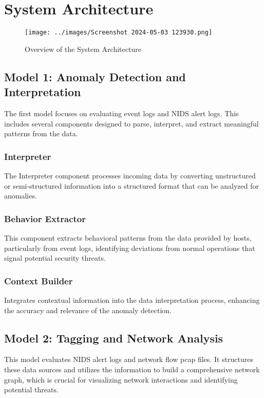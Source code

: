 \section{System Architecture}

\begin{figure*}[!htb]
    \centering
    \texttt{[image: ../images/Screenshot 2024-05-03 123930.png]}
    \caption{Overview of the System Architecture}
    \label{fig:systemarch}
\end{figure*}



\subsection{Model 1: Anomaly Detection and Interpretation}
The first model focuses on evaluating event logs and NIDS alert logs. This includes several components designed to parse, interpret, and extract meaningful patterns from the data.

\subsubsection{Interpreter}
The Interpreter component processes incoming data by converting unstructured or semi-structured information into a structured format that can be analyzed for anomalies.

\subsubsection{Behavior Extractor}
This component extracts behavioral patterns from the data provided by hosts, particularly from event logs, identifying deviations from normal operations that signal potential security threats.

\subsubsection{Context Builder}
Integrates contextual information into the data interpretation process, enhancing the accuracy and relevance of the anomaly detection.

\subsection{Model 2: Tagging and Network Analysis}
This model evaluates NIDS alert logs and network flow pcap files. It structures these data sources and utilizes the information to build a comprehensive network graph, which is crucial for visualizing network interactions and identifying potential threats.

